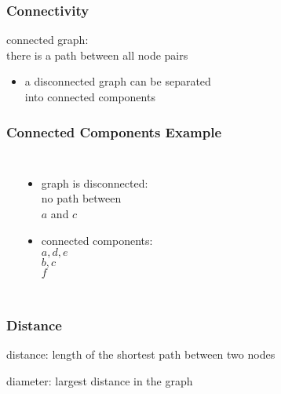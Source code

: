 \documentclass[dvipsnames]{beamer}
\begin{document}
\begin{frame}
  \frametitle{Connectivity}

  \begin{definition}
    \alert{connected graph}:\\
    there is a path between all node pairs
  \end{definition}

  \pause
  \begin{itemize}
    \item a disconnected graph can be separated\\
      into connected components
  \end{itemize}
\end{frame}

\begin{frame}
  \frametitle{Connected Components Example}

  \begin{example}
    \begin{columns}
      \begin{center}
      \end{center}

      \pause
      \begin{itemize}
        \item graph is disconnected:\\
          no path between\\
          $a$ and $c$
        \item connected components:\\
          $a,d,e$\\
          $b,c$\\
          $f$
      \end{itemize}
    \end{columns}
  \end{example}
\end{frame}

\begin{frame}
  \frametitle{Distance}

  \begin{definition}
    \alert{distance}: length of the shortest path between two nodes
  \end{definition}

  \pause
  \begin{definition}
    \alert{diameter}: largest distance in the graph
  \end{definition}
\end{frame}
\end{document}
